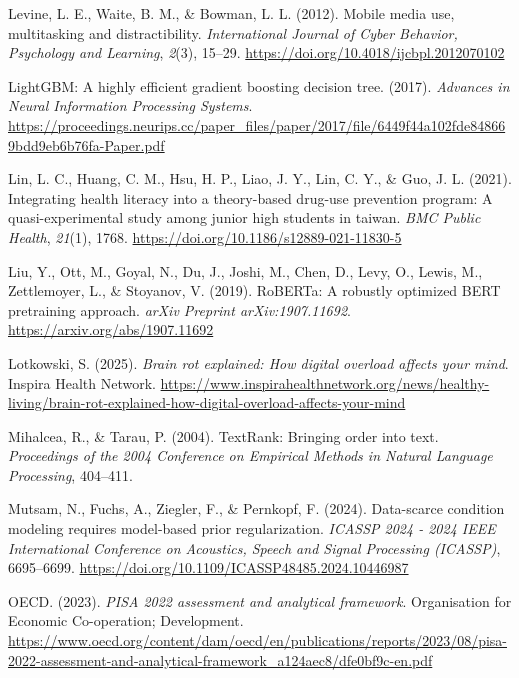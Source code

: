 \documentclass[
  titlepage]{article}
\newlength{\cslhangindent}
\newenvironment{CSLReferences}[2] %
 {\begin{list}{}{%
  \setlength{\itemindent}{0pt}
  \setlength{\leftmargin}{0pt}
  \setlength{\parsep}{0pt}
  \ifodd #1
   \setlength{\leftmargin}{\cslhangindent}
   \setlength{\itemindent}{-1\cslhangindent}
  \fi
  \setlength{\itemsep}{#2\baselineskip}}}
 {\end{list}}
\begin{document}
\begin{CSLReferences}{1}{0}
Levine, L. E., Waite, B. M., \& Bowman, L. L. (2012). Mobile media use,
multitasking and distractibility. \emph{International Journal of Cyber
Behavior, Psychology and Learning}, \emph{2}(3), 15--29.
\url{https://doi.org/10.4018/ijcbpl.2012070102}

LightGBM: A highly efficient gradient boosting decision tree. (2017).
\emph{Advances in Neural Information Processing Systems}.
\url{https://proceedings.neurips.cc/paper_files/paper/2017/file/6449f44a102fde848669bdd9eb6b76fa-Paper.pdf}

Lin, L. C., Huang, C. M., Hsu, H. P., Liao, J. Y., Lin, C. Y., \& Guo,
J. L. (2021). Integrating health literacy into a theory-based drug-use
prevention program: A quasi-experimental study among junior high
students in taiwan. \emph{BMC Public Health}, \emph{21}(1), 1768.
\url{https://doi.org/10.1186/s12889-021-11830-5}

Liu, Y., Ott, M., Goyal, N., Du, J., Joshi, M., Chen, D., Levy, O.,
Lewis, M., Zettlemoyer, L., \& Stoyanov, V. (2019). RoBERTa: A robustly
optimized BERT pretraining approach. \emph{arXiv Preprint
arXiv:1907.11692}. \url{https://arxiv.org/abs/1907.11692}

Lotkowski, S. (2025). \emph{Brain rot explained: How digital overload
affects your mind}. Inspira Health Network.
\url{https://www.inspirahealthnetwork.org/news/healthy-living/brain-rot-explained-how-digital-overload-affects-your-mind}

Mihalcea, R., \& Tarau, P. (2004). TextRank: Bringing order into text.
\emph{Proceedings of the 2004 Conference on Empirical Methods in Natural
Language Processing}, 404--411.

Mutsam, N., Fuchs, A., Ziegler, F., \& Pernkopf, F. (2024). Data-scarce
condition modeling requires model-based prior regularization.
\emph{ICASSP 2024 - 2024 IEEE International Conference on Acoustics,
Speech and Signal Processing (ICASSP)}, 6695--6699.
\url{https://doi.org/10.1109/ICASSP48485.2024.10446987}

OECD. (2023). \emph{PISA 2022 assessment and analytical framework}.
Organisation for Economic Co-operation; Development.
\url{https://www.oecd.org/content/dam/oecd/en/publications/reports/2023/08/pisa-2022-assessment-and-analytical-framework_a124aec8/dfe0bf9c-en.pdf}


\end{CSLReferences}
\end{document}

